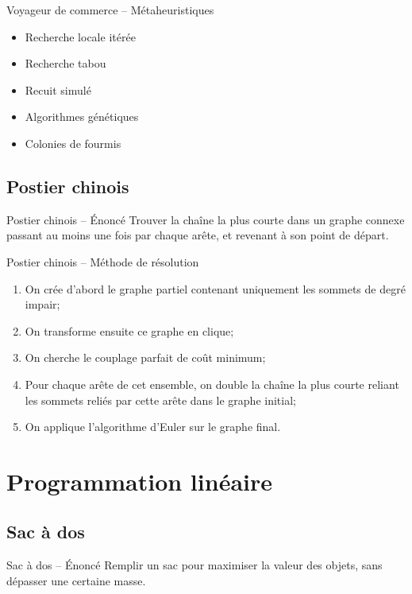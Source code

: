 \documentclass{beamer}
\begin{document}
\begin{frame}{Voyageur de commerce -- Métaheuristiques}
    \begin{itemize}
        \item Recherche locale itérée
        \item Recherche tabou
        \item Recuit simulé
        \item Algorithmes génétiques
        \item Colonies de fourmis
    \end{itemize}
\end{frame}

\subsection{Postier chinois}
\begin{frame}{Postier chinois -- Énoncé}
  Trouver la chaîne la plus courte dans un graphe connexe passant au moins 
  une fois par chaque arête, et revenant à son point de départ.
\end{frame}

\begin{frame}{Postier chinois -- Méthode de résolution}
  \begin{enumerate}
    \item On crée d'abord le graphe partiel contenant uniquement les sommets
      de degré impair;
    \item On transforme ensuite ce graphe en clique;
    \item On cherche le couplage parfait de coût minimum;
    \item Pour chaque arête de cet ensemble, on double la chaîne la plus
      courte reliant les sommets reliés par cette arête dans le graphe initial;
    \item On applique l'algorithme d'Euler sur le graphe final.
  \end{enumerate}
\end{frame}

\section{Programmation linéaire}
\subsection{Sac à dos}
  \begin{frame}{Sac à dos -- Énoncé}
    Remplir un sac pour maximiser la valeur des objets, sans dépasser une
    certaine masse.
  \end{frame}
\end{document}
